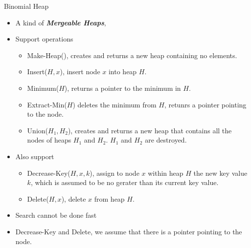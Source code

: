 \documentclass{beamer}
\begin{document}
\begin{frame}{}
\centerline{Binomial Heap}
\begin{itemize}
\item A kind of {\it \bf Mergeable Heaps},
\item Support operations
\begin{itemize}
\item {\sc Make-Heap()}, creates and returns a new heap containing no elements.
\item {\sc Insert($H,x$)}, insert node $x$ into heap $H$. 
\item {\sc Minimum($H$)}, returns a pointer to the minimum in $H$.
\item {\sc Extract-Min($H$)} deletes the minimum from $H$, retunrs a pointer pointing to the node.
\item {\sc Union($H_1,H_2$)}, creates and returns a new heap that contains all the nodes of heaps $H_1$ and $H_2$. 
 $H_1$ and $H_2$ are destroyed. 
\end{itemize}
\end{itemize}
\end{frame}

\begin{frame}{}
\begin{itemize}
\item Also support
\begin{itemize}
\item {\sc Decrease-Key}($H,x,k$), assign to node $x$
 within heap $H$ the new key value $k$, which is assumed to be no gerater than its current key value. 
\item {\sc Delete($H,x$)}, delete $x$ from heap $H$. 
\end{itemize}
\item {\sc Search} cannot be done fast
\item {\sc Decrease-Key} and {\sc Delete}, we assume that there is a pointer pointing to the node. 
\end{itemize}
\end{frame}
\end{document}
